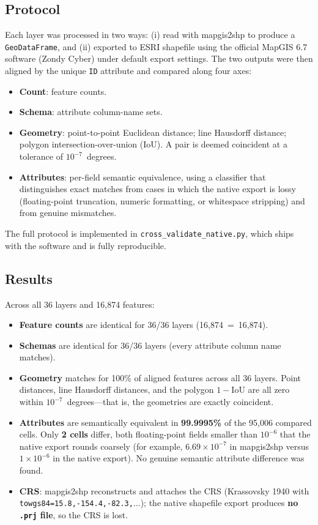 \documentclass[11pt,a4paper]{article}
\begin{document}
\subsection{Protocol}
Each layer was processed in two ways: (i) read with mapgis2shp to produce a \texttt{GeoDataFrame}, and (ii) exported to ESRI shapefile using the official MapGIS 6.7 software (Zondy Cyber) under default export settings. The two outputs were then aligned by the unique \texttt{ID} attribute and compared along four axes:
\begin{itemize}
  \item \textbf{Count}: feature counts.
  \item \textbf{Schema}: attribute column-name sets.
  \item \textbf{Geometry}: point-to-point Euclidean distance; line Hausdorff distance; polygon intersection-over-union (IoU). A pair is deemed coincident at a tolerance of $10^{-7}$~degrees.
  \item \textbf{Attributes}: per-field semantic equivalence, using a classifier that distinguishes exact matches from cases in which the native export is lossy (floating-point truncation, numeric formatting, or whitespace stripping) and from genuine mismatches.
\end{itemize}
The full protocol is implemented in \texttt{cross\_validate\_native.py}, which ships with the software and is fully reproducible.

\subsection{Results}
Across all 36 layers and 16{,}874 features:
\begin{itemize}
  \item \textbf{Feature counts} are identical for 36/36 layers (16{,}874~=~16{,}874).
  \item \textbf{Schemas} are identical for 36/36 layers (every attribute column name matches).
  \item \textbf{Geometry} matches for 100\% of aligned features across all 36 layers. Point distances, line Hausdorff distances, and the polygon $1-\mathrm{IoU}$ are all zero within $10^{-7}$~degrees---that is, the geometries are exactly coincident.
  \item \textbf{Attributes} are semantically equivalent in \textbf{99.9995\%} of the 95{,}006 compared cells. Only \textbf{2 cells} differ, both floating-point fields smaller than $10^{-6}$ that the native export rounds coarsely (for example, $6.69\times10^{-7}$ in mapgis2shp versus $1\times10^{-6}$ in the native export). No genuine semantic attribute difference was found.
  \item \textbf{CRS}: mapgis2shp reconstructs and attaches the CRS (Krassovsky 1940 with \texttt{towgs84=15.8,-154.4,-82.3,$\ldots$}); the native shapefile export produces \textbf{no \texttt{.prj} file}, so the CRS is lost.
\end{itemize}
\end{document}
